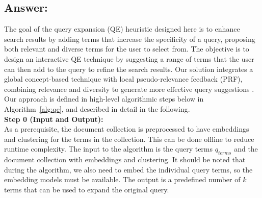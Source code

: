 

\subsection*{Answer:}

The goal of the query expansion (QE) heuristic designed here is to enhance search results by adding terms that increase the specificity of a query, proposing both relevant and diverse terms for the user to select from. The objective is to design an interactive QE technique by suggesting a range of terms that the user can then add to the query to refine the search results.  
Our solution integrates a global concept-based technique with local pseudo-relevance feedback (PRF), combining relevance and diversity to generate more effective query suggestions \cite{azad2019query}. Our approach is defined in high-level algorithmic steps below in Algorithm~\ref{alg:qe}, and described in detail in the following.\\

\textbf{Step 0 (Input and Output):}\\
As a prerequisite, the document collection is preprocessed to have embeddings and clustering for the terms in the collection. This can be done offline to reduce runtime complexity.  
The input to the algorithm is the query terms $q_{terms}$ and the document collection with embeddings and clustering. It should be noted that during the algorithm, we also need to embed the individual query terms, so the embedding models must be available.  
The output is a predefined number of $k$ terms that can be used to expand the original query.\\

